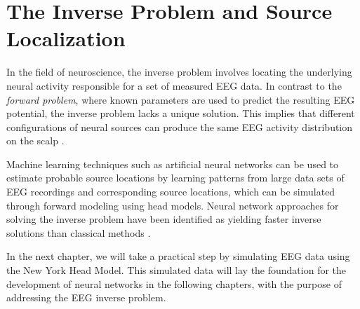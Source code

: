 \documentclass[a4paper, UKenglish, 11pt]{uiomaster}
\begin{document}
\section{The Inverse Problem and Source Localization}
In the field of neuroscience, the inverse problem involves locating the underlying neural activity responsible for a set of measured EEG data. In contrast to the \emph{forward problem}, where known parameters are used to predict the resulting EEG potential, the inverse problem lacks a unique solution. This implies that different configurations of neural sources can produce the same EEG activity distribution on the scalp \cite{hecker2021convdip}.

Machine learning techniques such as artificial neural networks can be used to estimate probable source locations by learning patterns from large data sets of EEG recordings and corresponding source locations, which can be simulated through forward modeling using head models. Neural network approaches for solving the inverse problem have been identified as yielding faster inverse solutions than classical methods \cite{sclabassi2001eeg}.

In the next chapter, we will take a practical step by simulating EEG data using the New York Head Model. This simulated data will lay the foundation for the development of neural networks in the following chapters, with the purpose of addressing the EEG inverse problem.
\end{document}
